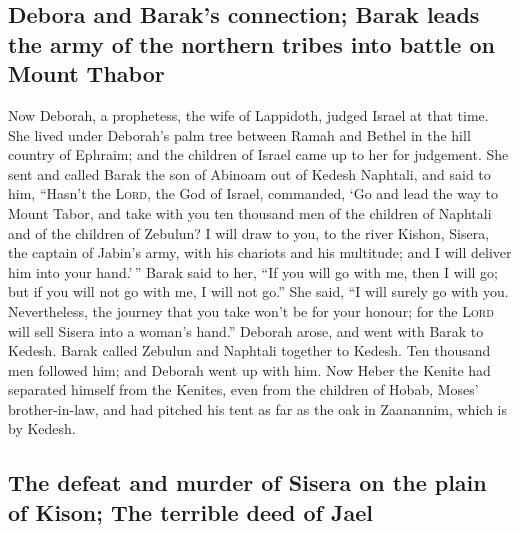 \hypertarget{debora-and-baraks-connection-barak-leads-the-army-of-the-northern-tribes-into-battle-on-mount-thabor}{%
\subsection{Debora and Barak's connection; Barak leads the army of the
northern tribes into battle on Mount
Thabor}\label{debora-and-baraks-connection-barak-leads-the-army-of-the-northern-tribes-into-battle-on-mount-thabor}}

 Now Deborah, a prophetess, the wife of Lappidoth, judged
Israel at that time.  She lived under Deborah's palm tree
between Ramah and Bethel in the hill country of Ephraim; and the
children of Israel came up to her for judgement.  She sent
and called Barak the son of Abinoam out of Kedesh Naphtali, and said to
him, ``Hasn't the \textsc{Lord}, the God of Israel, commanded, `Go and
lead the way to Mount Tabor, and take with you ten thousand men of the
children of Naphtali and of the children of Zebulun?  I
will draw to you, to the river Kishon, Sisera, the captain of Jabin's
army, with his chariots and his multitude; and I will deliver him into
your hand.'\,''  Barak said to her, ``If you will go with
me, then I will go; but if you will not go with me, I will not go.''
 She said, ``I will surely go with you. Nevertheless, the
journey that you take won't be for your honour; for the \textsc{Lord}
will sell Sisera into a woman's hand.'' Deborah arose, and went with
Barak to Kedesh.  Barak called Zebulun and Naphtali
together to Kedesh. Ten thousand men followed him; and Deborah went up
with him.  Now Heber the Kenite had separated himself
from the Kenites, even from the children of Hobab, Moses'
brother-in-law, and had pitched his tent as far as the oak in Zaanannim,
which is by Kedesh.

\hypertarget{the-defeat-and-murder-of-sisera-on-the-plain-of-kison-the-terrible-deed-of-jael}{%
\subsection{The defeat and murder of Sisera on the plain of Kison; The
terrible deed of
Jael}\label{the-defeat-and-murder-of-sisera-on-the-plain-of-kison-the-terrible-deed-of-jael}}

